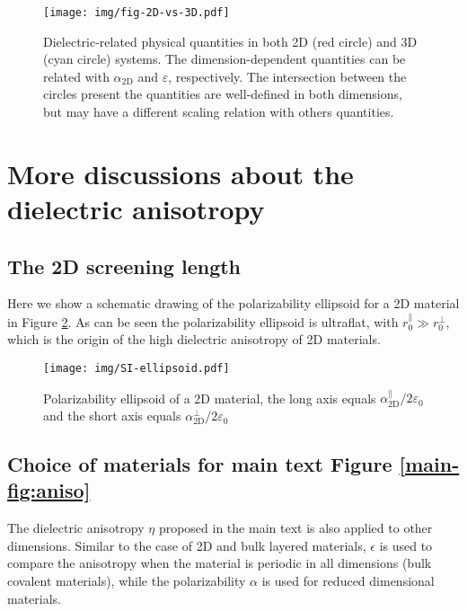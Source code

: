 \documentclass[manuscript=suppinfo,email=true,hyperref=true,keywords=false]{achemso}
\begin{document}
\begin{figure}[htbp]
\centering
\texttt{[image: img/fig-2D-vs-3D.pdf]}
\caption{\label{fig-2D-3D} Dielectric-related physical quantities in
  both 2D (red circle) and 3D (cyan circle) systems. The
  dimension-dependent quantities can be related with $\alpha_{\mathrm{2D}}$ and
  $\varepsilon$, respectively. The intersection between the circles
  present the quantities are well-defined in both dimensions, but may have a
  different scaling relation with others quantities.}
\end{figure}


\section{More discussions about the dielectric anisotropy}
\label{sec:aniso}
\subsection{The 2D screening length}
\label{ssec:2D-screening}
Here we show a schematic drawing of the polarizability ellipsoid for a
2D material in Figure \ref{fig:ellipsoid}. As can be seen the
polarizability ellipsoid is ultraflat, with
$r_{0}^{\parallel} \gg r_{0}^{\perp}$, which is the origin of the high
dielectric anisotropy of 2D materials.

\begin{figure}[H]
  \centering
  \texttt{[image: img/SI-ellipsoid.pdf]}
  \caption{Polarizability ellipsoid of a 2D material, the long axis
    equals $\alpha_{\mathrm{2D}}^{\parallel}/2\varepsilon_{0}$ and the short axis
    equals  $\alpha_{\mathrm{2D}}^{\perp}/2\varepsilon_{0}$}
  \label{fig:ellipsoid}
\end{figure}

\subsection{Choice of materials for main text Figure \ref{main-fig:aniso}}
\label{ssec:aniso-materials}
The dielectric anisotropy $\eta$ proposed in the main text is also
applied to other dimensions. Similar to the case of 2D and bulk
layered materials, $\epsilon$ is used to compare the anisotropy when
the material is periodic in all dimensions (bulk covalent materials),
while the polarizability $\alpha$ is used for reduced dimensional
materials.
\end{document}
